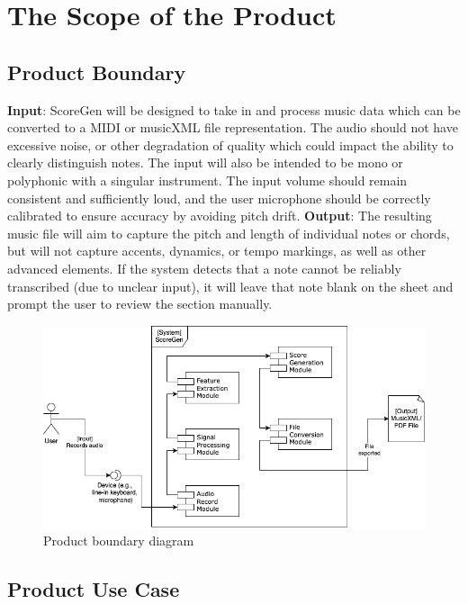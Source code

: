 \documentclass[12pt]{article}
\begin{document}
\section{The Scope of the Product}
\subsection{Product Boundary}
\textbf{Input}: ScoreGen will be designed to take in and process music data which can be converted to a MIDI or musicXML file representation. The audio should not have excessive noise, or other degradation of quality which could impact the ability to clearly distinguish notes. The input will also be intended to be mono or polyphonic with a singular instrument. The input volume should remain consistent and sufficiently loud, and the user microphone should be correctly calibrated to ensure accuracy by avoiding pitch drift.
\newline
\textbf{Output}: The resulting music file will aim to capture the pitch and length of individual notes or chords, but will not capture accents, dynamics, or tempo markings, as well as other advanced elements. If the system detects that a note cannot be reliably transcribed (due to unclear input), it will leave that note blank on the sheet and prompt the user to review the section manually.
\begin{figure}[H]
  \includegraphics[width=\textwidth]{SRS-product-boundary.png}
  \caption{Product boundary diagram}
\end{figure}

\subsection{Product Use Case}
\end{document}
